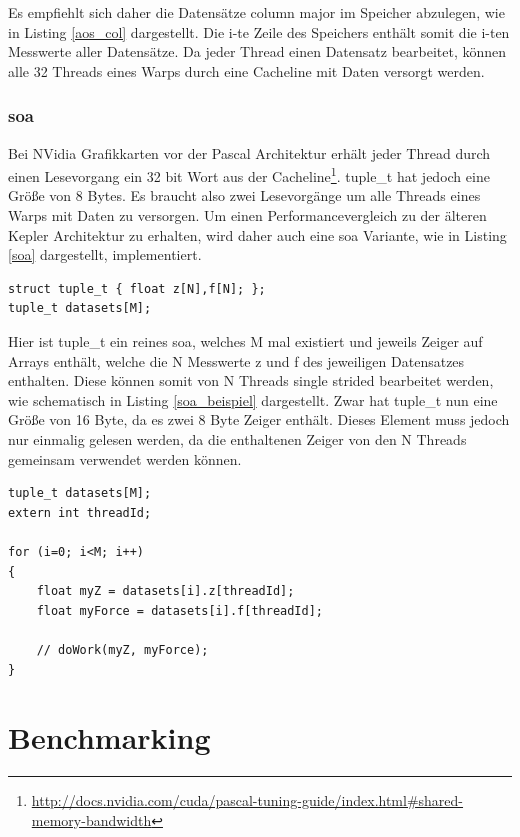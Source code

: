 Es empfiehlt sich daher die Datensätze column major im Speicher abzulegen, wie in Listing \ref{aos_col} dargestellt. Die i-te Zeile des Speichers enthält somit die i-ten Messwerte aller Datensätze. Da jeder Thread einen Datensatz bearbeitet, können alle 32 Threads eines Warps durch eine Cacheline mit Daten versorgt werden.


\subsection{\acrlong{soa}}
Bei NVidia Grafikkarten vor der Pascal Architektur erhält jeder Thread durch einen Lesevorgang ein 32 bit Wort aus der Cacheline\footnote{\href{http://docs.nvidia.com/cuda/pascal-tuning-guide/index.html\#shared-memory-bandwidth}{http://docs.nvidia.com/cuda/pascal-tuning-guide/index.html\#shared-memory-bandwidth}}. tuple\_t hat jedoch eine Größe von 8 Bytes. 
Es braucht also zwei Lesevorgänge um alle Threads eines Warps mit Daten zu versorgen.
Um einen Performancevergleich zu der älteren Kepler Architektur zu erhalten, wird daher auch eine \gls{soa} Variante, wie in Listing \ref{soa} dargestellt, implementiert.

\begin{lstlisting}[label=soa,caption=\gls{soa}]
struct tuple_t { float z[N],f[N]; };
tuple_t datasets[M];
\end{lstlisting}

Hier ist tuple\_t ein reines \gls{soa}, welches M mal existiert und jeweils Zeiger auf Arrays enthält, welche die N Messwerte z und f des jeweiligen Datensatzes enthalten. Diese können somit von N Threads single strided bearbeitet werden, wie schematisch in Listing \ref{soa_beispiel} dargestellt.
Zwar hat tuple\_t nun eine Größe von 16 Byte, da es zwei 8 Byte Zeiger enthält. Dieses Element muss jedoch nur einmalig gelesen werden, da die enthaltenen Zeiger von den N Threads gemeinsam verwendet werden können.

\begin{lstlisting}[label=soa_beispiel,caption=Bearbeitung eines \gls{soa}]
tuple_t datasets[M];
extern int threadId;

for (i=0; i<M; i++)
{
    float myZ = datasets[i].z[threadId];
    float myForce = datasets[i].f[threadId];
    
    // doWork(myZ, myForce);
}
\end{lstlisting}


\chapter{Benchmarking}
%
%


